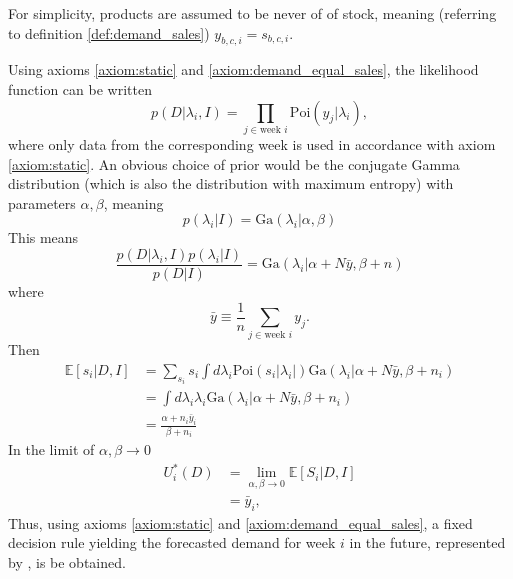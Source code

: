 \begin{axiom}
	\label{axiom:demand_equal_sales}
	For simplicity, products are assumed to be never of of stock, meaning (referring to definition \ref{def:demand_sales}) $y_{b,c,i} = s_{b,c,i}$.
\end{axiom}

Using axioms \ref{axiom:static} and \ref{axiom:demand_equal_sales}, the likelihood function can be written
\begin{equation}
	p(D|\lambda_i,I) = \prod_{j\in \text{week }i}\text{Poi}(y_j|\lambda_i),
\end{equation}
where only data from the corresponding week is used in accordance with axiom \ref{axiom:static}. An obvious choice of prior would be the conjugate Gamma distribution (which is also the distribution with maximum entropy) with parameters $\alpha,\beta$, meaning
\begin{equation}
	p(\lambda_i|I) = \text{Ga}(\lambda_i|\alpha,\beta)
\end{equation}
This means
\begin{equation}
	\frac{p(D|\lambda_i,I)p(\lambda_i|I)}{p(D|I)}= \text{Ga}(\lambda_i|\alpha+N\bar{y},\beta +n)
\end{equation}
where
\begin{equation}
	\bar{y} \equiv \frac{1}{n}\sum_{j \in \text{week }i} y_j.
\end{equation}
Then
\begin{equation}
	\begin{split}
		\mathbb{E}[s_i|D,I] &=\sum_{s_i} s_i\int d\lambda_i \text{Poi}(s_i|\lambda_i|)\text{Ga}(\lambda_i|\alpha+N\bar{y},\beta +n_i)\\
		&=\int d\lambda_i \lambda_i\text{Ga}(\lambda_i|\alpha+N\bar{y},\beta +n_i)\\
		& = \frac{\alpha+n_i\bar{y}_i}{\beta+n_i}
	\end{split}
\end{equation}
In the limit of $\alpha,\beta \rightarrow 0$
\begin{equation}
	\begin{split}
		U_i^*(D) &=\lim\limits_{\alpha,\beta \rightarrow 0}\mathbb{E}[S_i|D,I]\\
		& = \bar{y}_i,
	\end{split}
	\label{eq:decision_rule2}
\end{equation}
Thus, using axioms \ref{axiom:static} and \ref{axiom:demand_equal_sales}, a fixed decision rule yielding the forecasted demand for week $i$ in the future, represented by , is be obtained.

